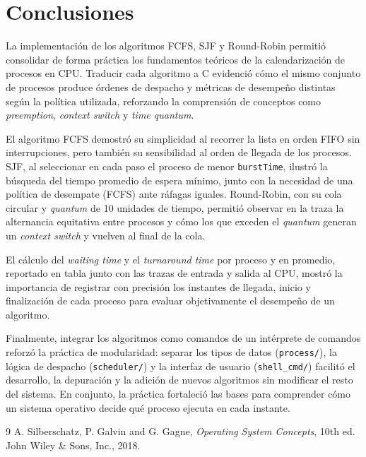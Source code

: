 \documentclass[12pt]{article}
\begin{document}
\section{Conclusiones}
    La implementación de los algoritmos FCFS, SJF y Round-Robin permitió consolidar de forma práctica los fundamentos teóricos de la calendarización de procesos en CPU. Traducir cada algoritmo a C evidenció cómo el mismo conjunto de procesos produce órdenes de despacho y métricas de desempeño distintas según la política utilizada, reforzando la comprensión de conceptos como \textit{preemption}, \textit{context switch} y \textit{time quantum}. \par
    El algoritmo FCFS demostró su simplicidad al recorrer la lista en orden FIFO sin interrupciones, pero también su sensibilidad al orden de llegada de los procesos. SJF, al seleccionar en cada paso el proceso de menor \texttt{burstTime}, ilustró la búsqueda del tiempo promedio de espera mínimo, junto con la necesidad de una política de desempate (FCFS) ante ráfagas iguales. Round-Robin, con su cola circular y \textit{quantum} de 10 unidades de tiempo, permitió observar en la traza la alternancia equitativa entre procesos y cómo los que exceden el \textit{quantum} generan un \textit{context switch} y vuelven al final de la cola. \par
    El cálculo del \textit{waiting time} y el \textit{turnaround time} por proceso y en promedio, reportado en tabla junto con las trazas de entrada y salida al CPU, mostró la importancia de registrar con precisión los instantes de llegada, inicio y finalización de cada proceso para evaluar objetivamente el desempeño de un algoritmo. \par
    Finalmente, integrar los algoritmos como comandos de un intérprete de comandos reforzó la práctica de modularidad: separar los tipos de datos (\texttt{process/}), la lógica de despacho (\texttt{scheduler/}) y la interfaz de usuario (\texttt{shell\_cmd/}) facilitó el desarrollo, la depuración y la adición de nuevos algoritmos sin modificar el resto del sistema. En conjunto, la práctica fortaleció las bases para comprender cómo un sistema operativo decide qué proceso ejecuta en cada instante.

\begin{thebibliography}{9}
A. Silberschatz, P. Galvin and G. Gagne,
\textit{Operating System Concepts}, 10th ed.
John Wiley \& Sons, Inc., 2018.
\end{thebibliography}
\end{document}
